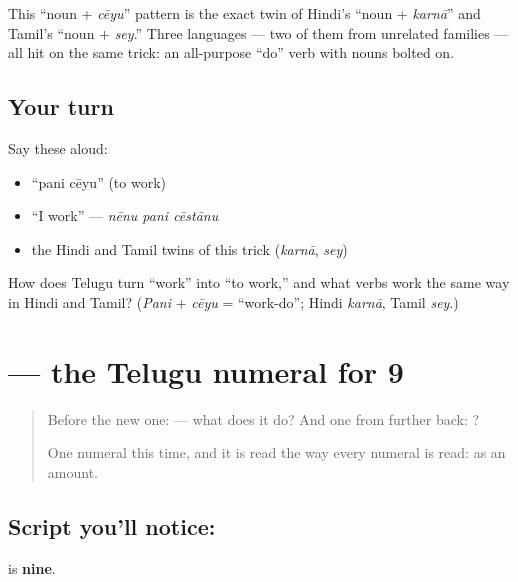 \begin{grammarlens}[title={Grammar Lens: noun + \te{చేయు} = a new verb}]
This \textquotedblleft{}noun + \emph{cēyu}\textquotedblright{} pattern is the exact twin of Hindi's \textquotedblleft{}noun + \emph{karnā}\textquotedblright{} and Tamil's \textquotedblleft{}noun + \emph{sey}.\textquotedblright{} Three languages — two of them from unrelated families — all hit on the same trick: an all-purpose \textquotedblleft{}do\textquotedblright{} verb with nouns bolted on.
\end{grammarlens}

\subsection*{Your turn}
Say these aloud:

\begin{itemize}
\raggedright
  \item \textquotedblleft{}pani cēyu\textquotedblright{} (to work)
  \item \textquotedblleft{}I work\textquotedblright{} — \emph{nēnu pani cēstānu}
  \item the Hindi and Tamil twins of this trick (\emph{karnā}, \emph{sey})
\end{itemize}

\begin{tcolorbox}[breakable,colback=teal!4,colframe=teal!35!black,title={Before you move on}]
How does Telugu turn \textquotedblleft{}work\textquotedblright{} into \textquotedblleft{}to work,\textquotedblright{} and what verbs work the same way in Hindi and Tamil? (\emph{Pani} + \emph{cēyu} = \textquotedblleft{}work-do\textquotedblright{}; Hindi \emph{karnā}, Tamil \emph{sey}.)
\end{tcolorbox}
\section[\texorpdfstring{\te{౯} (9)}{౯ (9)}]{ — the Telugu numeral for 9}

\label{lesson:TE-S148-digit-9}



\begin{quote}
Before the new one:  — what does it do? And one from further back: ?

One numeral this time, and it is read the way every numeral is read: as an amount.
\end{quote}

\subsection*{Script you'll notice: }
\textbf{} is \textbf{nine}.

